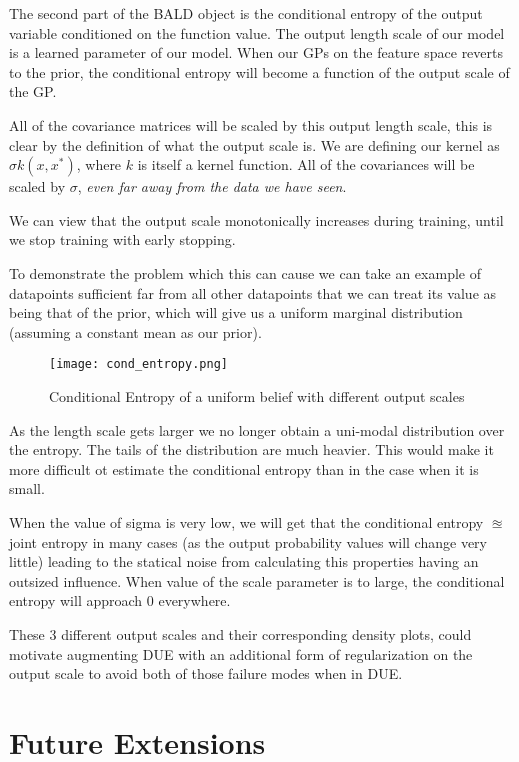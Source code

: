 \documentclass[12pt, a4paper]{report}
\theoremstyle{definition}
\theoremstyle{definition}
\theoremstyle{definition}
\begin{document}
The second part of the BALD object is the conditional entropy of the output variable conditioned on the function value. The output length scale of our model is a learned parameter of our model. When our GPs on the feature space reverts to the prior, the conditional entropy will become a function of the output scale of the GP.

All of the covariance matrices will be scaled by this output length scale, this is clear by the definition of what the output scale is. We are defining our kernel as $\sigma k \left(x, x^* \right)$, where $k$ is itself a kernel function. All of the covariances will be scaled by $\sigma$, \textit{even far away from the data we have seen}.

We can view that the output scale monotonically increases during training, until we stop training with early stopping.

To demonstrate the problem which this can cause we can take an example of datapoints sufficient far from all other datapoints that we can treat its value as being that of the prior, which will give us a uniform marginal distribution (assuming a constant mean as our prior).


\begin{figure}[H]
    \centering
        \texttt{[image: cond\_entropy.png]}
        \caption{Conditional Entropy of a uniform belief with different output scales }

\end{figure}

As the length scale gets larger we no longer obtain a uni-modal distribution over the entropy. The tails of the distribution are much heavier. This would make it more difficult ot estimate the conditional entropy than in the case when it is small. 

When the value of sigma is very low, we will get that the conditional entropy $\approxeq$ joint entropy in many cases (as the output probability values will change very little) leading to the statical noise from calculating this properties having an outsized influence. When value of the scale parameter is to large, the conditional entropy will approach $0$ everywhere.

These 3 different output scales and their corresponding density plots, could motivate augmenting DUE with an additional form of regularization on the output scale to avoid both of those failure modes when in DUE.


\section{Future Extensions}
\end{document}

